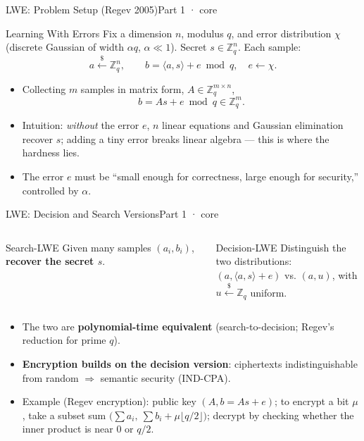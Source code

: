 \documentclass[aspectratio=169, 11pt]{beamer}
\newcommand{\Z}{\mathbb{Z}}
\begin{document}
\begin{frame}{LWE: Problem Setup (Regev 2005)}{Part 1 · core}
  \begin{block}{Learning With Errors}
    Fix a dimension $n$, modulus $q$, and error distribution $\chi$ (discrete Gaussian of width $\alpha q$, $\alpha\ll1$).
    Secret $s\in\Z_q^n$. Each sample:
    \[
      a \xleftarrow{\$} \Z_q^n,\qquad
      b = \langle a, s\rangle + e \bmod q,\quad e\leftarrow\chi.
    \]
  \end{block}
  \begin{itemize}\small
    \item Collecting $m$ samples in matrix form, $A\in\Z_q^{m\times n}$,
      \[
        b = A s + e \bmod q \in \Z_q^m.
      \]
    \item Intuition: \emph{without} the error $e$, $n$ linear equations and Gaussian elimination recover $s$;
      \alert{adding a tiny error breaks linear algebra} --- this is where the hardness lies.
    \item The error $e$ must be ``small enough for correctness, large enough for security,'' controlled by $\alpha$.
  \end{itemize}
\end{frame}

\begin{frame}{LWE: Decision and Search Versions}{Part 1 · core}
  \begin{columns}[T]
    \begin{column}{0.5\textwidth}
      \begin{block}{Search-LWE}
        Given many samples $(a_i,b_i)$, \textbf{recover the secret $s$}.
      \end{block}
    \end{column}
    \begin{column}{0.5\textwidth}
      \begin{block}{Decision-LWE}
        Distinguish the two distributions:\\
        $(a, \langle a,s\rangle+e)$ \quad vs.\quad
        $(a, u)$, with $u\xleftarrow{\$}\Z_q$ uniform.
      \end{block}
    \end{column}
  \end{columns}
  \vspace{4pt}
  \begin{itemize}\small
    \item The two are \textbf{polynomial-time equivalent} (search-to-decision; Regev's reduction for prime $q$).
    \item \textbf{Encryption builds on the decision version}: ciphertexts indistinguishable from random $\Rightarrow$ semantic security (IND-CPA).
    \item Example (Regev encryption): public key $(A, b=As+e)$; to encrypt a bit $\mu$, take a subset sum
      $\bigl(\textstyle\sum a_i,\ \sum b_i + \mu\lfloor q/2\rfloor\bigr)$;
      decrypt by checking whether the inner product is near $0$ or $q/2$.
  \end{itemize}
\end{frame}
\end{document}
